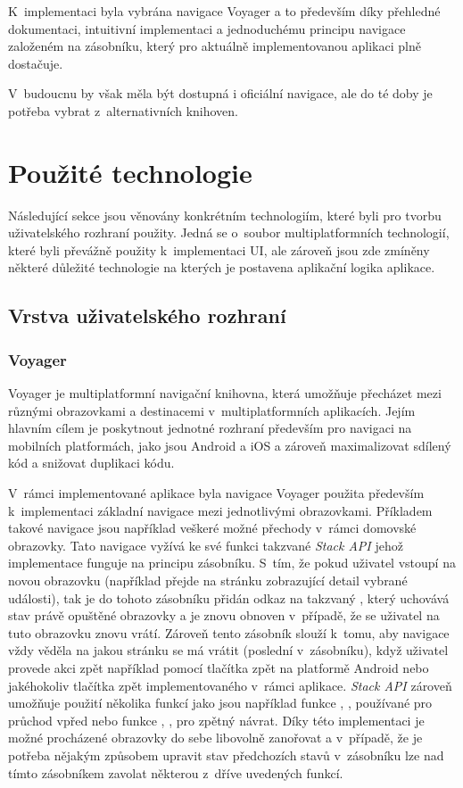 \medskip

K~implementaci byla vybrána navigace Voyager a 
to především díky přehledné dokumentaci, intuitivní implementaci a jednoduchému principu navigace založeném na zásobníku, který pro aktuálně
implementovanou aplikaci plně dostačuje.

V~budoucnu by však měla být dostupná i oficiální navigace, ale do té doby je potřeba vybrat z~alternativních knihoven.

\section{Použité technologie}
Následující sekce jsou věnovány konkrétním technologiím, které byli pro tvorbu uživatelského rozhraní použity.
Jedná se o~soubor multiplatformních technologií, které byli převážně použity k~implementaci UI, ale zároveň jsou zde zmíněny některé 
důležité technologie na kterých je postavena aplikační logika aplikace.

\subsection{Vrstva uživatelského rozhraní}

\subsubsection*{Voyager}
Voyager je multiplatformní navigační knihovna, která umožňuje přecházet mezi různými obrazovkami a destinacemi v~multiplatformních
aplikacích. \cite{voyager} Jejím hlavním cílem je poskytnout jednotné rozhraní především pro navigaci na mobilních platformách, jako 
jsou Android a iOS a zároveň maximalizovat sdílený kód a snižovat duplikaci kódu.

\medskip

V~rámci implementované aplikace byla navigace Voyager použita především k~implementaci základní navigace mezi jednotlivými obrazovkami.
Příkladem takové navigace jsou například veškeré možné přechody v~rámci domovské obrazovky. Tato navigace vyžívá ke své funkci takzvané 
\textit{Stack API} jehož implementace funguje na principu zásobníku. S~tím, že pokud uživatel vstoupí na novou obrazovku 
(například přejde na stránku zobrazující detail vybrané události), tak je do tohoto zásobníku přidán odkaz na takzvaný ,
který uchovává stav právě opuštěné obrazovky a je znovu obnoven v~případě, že se uživatel na tuto obrazovku znovu vrátí. Zároveň tento
zásobník slouží k~tomu, aby navigace vždy věděla na jakou stránku se má vrátit (poslední v~zásobníku), když uživatel provede akci zpět
například pomocí tlačítka zpět na platformě Android nebo jakéhokoliv tlačítka zpět implementovaného v~rámci aplikace. \textit{Stack API}
 zároveň umožňuje použití několika funkcí jako jsou například funkce , ,  používané pro průchod vpřed 
 nebo funkce , ,  pro zpětný návrat. 
Díky této implementaci je možné procházené obrazovky do sebe libovolně zanořovat a v~případě, že je potřeba nějakým způsobem upravit
stav předchozích stavů v~zásobníku lze nad tímto zásobníkem zavolat některou z~dříve uvedených funkcí.

